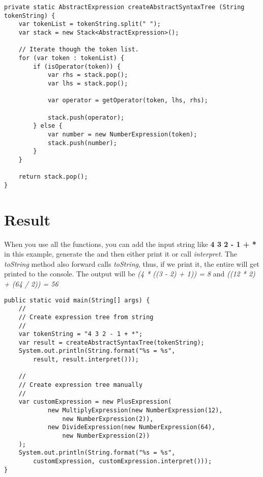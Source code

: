 \begin{verbatim}
private static AbstractExpression createAbstractSyntaxTree (String tokenString) {
    var tokenList = tokenString.split(" ");
    var stack = new Stack<AbstractExpression>();

    // Iterate though the token list.
    for (var token : tokenList) {
        if (isOperator(token)) {
            var rhs = stack.pop();
            var lhs = stack.pop();

            var operator = getOperator(token, lhs, rhs);

            stack.push(operator);
        } else {
            var number = new NumberExpression(token);
            stack.push(number);
        }
    }

    return stack.pop();
}
\end{verbatim}


\section{Result}

When you use all the functions, you can add the input string like \textbf{4 3 2 - 1 + *} in this example, generate the  and then either print it or call \textit{interpret}. The \textit{toString} method also forward calls \textit{toString}, thus, if we print it, the entire  will get printed to the console. The output will be \textit{(4 * ((3 - 2) + 1)) = 8} and \textit{((12 * 2) + (64 / 2)) = 56}

\begin{verbatim}
public static void main(String[] args) {
    //
    // Create expression tree from string
    //
    var tokenString = "4 3 2 - 1 + *";
    var result = createAbstractSyntaxTree(tokenString);
    System.out.println(String.format("%s = %s", 
        result, result.interpret()));

    //
    // Create expression tree manually
    //
    var customExpression = new PlusExpression(
            new MultiplyExpression(new NumberExpression(12), 
                new NumberExpression(2)),
            new DivideExpression(new NumberExpression(64), 
                new NumberExpression(2))
    );
    System.out.println(String.format("%s = %s", 
        customExpression, customExpression.interpret()));
}
\end{verbatim}
